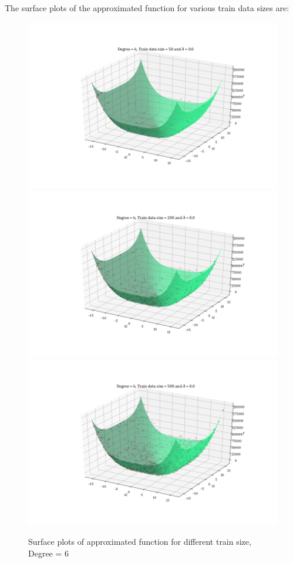 \documentclass[12pt,a4paper]{article}
\begin{document}
The surface plots of the approximated function for various train data sizes are:

\begin{figure}[H]
    \centering
    \includegraphics[scale=0.35]{images/D=6,T=50,l=0.0.png}
    \includegraphics[scale=0.35]{images/D=6,T=200,l=0.0.png}
    \includegraphics[scale=0.35]{images/D=6,T=500,l=0.0.png}
    \caption{Surface plots of approximated function for different train size, Degree = 6}
    \label{fig:sp_d6}
\end{figure}
\end{document}
